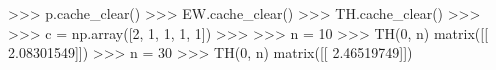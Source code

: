 
>>> p.cache_clear()
>>> EW.cache_clear()
>>> TH.cache_clear()
>>>
>>> c = np.array([2, 1, 1, 1, 1])
>>>
>>> n = 10
>>> TH(0, n)
matrix([[ 2.08301549]])
>>> n = 30
>>> TH(0, n)
matrix([[ 2.46519749]])

